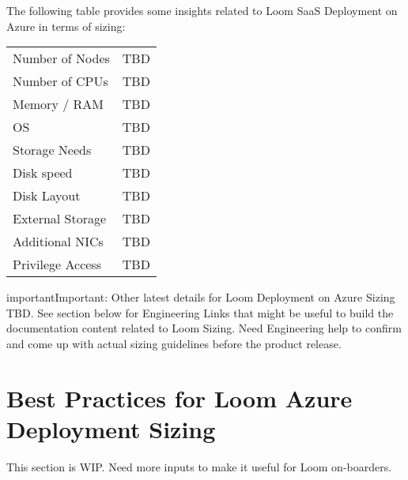 \documentclass[letterpaper,10pt,english]{sphinxmanual}
\begin{document}
The following table provides some insights related to Loom SaaS Deployment on Azure in terms of sizing:


\begin{savenotes}\sphinxattablestart
\centering
\begin{tabulary}{\linewidth}[t]{|T|T|}
\hline
{}\relax &\relax \\
\hline
Number of Nodes
&
TBD
\\
\hline
Number of CPUs
&
TBD
\\
\hline
Memory / RAM
&
TBD
\\
\hline
OS
&
TBD
\\
\hline
Storage Needs
&
TBD
\\
\hline
Disk speed
&
TBD
\\
\hline
Disk Layout
&
TBD
\\
\hline
External Storage
&
TBD
\\
\hline
Additional NICs
&
TBD
\\
\hline
Privilege Access
&
TBD
\\
\hline
\end{tabulary}
\par
\sphinxattableend\end{savenotes}

\begin{sphinxadmonition}{important}{Important:}
Other latest details for Loom Deployment on Azure Sizing TBD. See {\hyperref[\detokenize{loom_trbs_faq:sizing-ref}]{}} section below for Engineering Links that might be useful to build the documentation content related to Loom Sizing.  Need Engineering help to confirm and come up with actual sizing guidelines before the product release.
\end{sphinxadmonition}


\section{Best Practices for Loom Azure Deployment Sizing}
\label{\detokenize{loom_trbs_faq:best-practices-for-loom-azure-deployment-sizing}}
This section is WIP.  Need more inputs to make it useful for Loom on-boarders.
\end{document}
